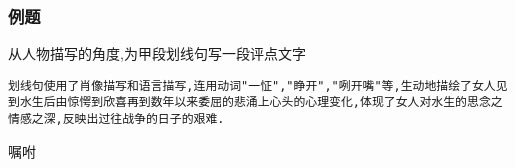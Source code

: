 \documentclass{ctexart}
\newcommand{\nm}{\normalsize}
\renewcommand{\\}{\par}
\begin{document}
\subsubsection{例题}
\large 
从人物描写的角度,为甲段划线句写一段评点文字\\
\texttt{划线句使用了肖像描写和语言描写,连用动词"一怔","睁开","咧开嘴"等,生动地描绘了女人见到水生后由惊愕到欣喜再到数年以来委屈的悲涌上心头的心理变化,体现了女人对水生的思念之情感之深,反映出过往战争的日子的艰难.}\\
\nm \fangsong \\\begin{center}嘱咐\end{center}\\
\end{document}
